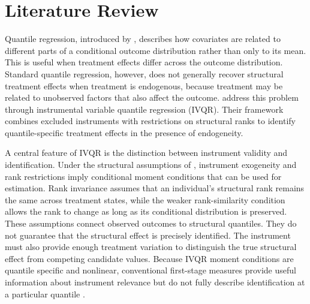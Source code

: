 \section{Literature Review}

Quantile regression, introduced by \textcite{koenker_bassett_1978}, describes how covariates are related to different parts of a conditional outcome distribution rather than only to its mean. This is useful when treatment effects differ across the outcome distribution. Standard quantile regression, however, does not generally recover structural treatment effects when treatment is endogenous, because treatment may be related to unobserved factors that also affect the outcome. \textcite{chernozhukov_hansen_2005} address this problem through instrumental variable quantile regression (IVQR). Their framework combines excluded instruments with restrictions on structural ranks to identify quantile-specific treatment effects in the presence of endogeneity.

A central feature of IVQR is the distinction between instrument validity and identification. Under the structural assumptions of \textcite{chernozhukov_hansen_2005}, instrument exogeneity and rank restrictions imply conditional moment conditions that can be used for estimation. Rank invariance assumes that an individual's structural rank remains the same across treatment states, while the weaker rank-similarity condition allows the rank to change as long as its conditional distribution is preserved. These assumptions connect observed outcomes to structural quantiles. They do not guarantee that the structural effect is precisely identified. The instrument must also provide enough treatment variation to distinguish the true structural effect from competing candidate values. Because IVQR moment conditions are quantile specific and nonlinear, conventional first-stage measures provide useful information about instrument relevance but do not fully describe identification at a particular quantile \parencite{chernozhukov_hansen_2005,chernozhukov_hansen_wuthrich_2017}.

